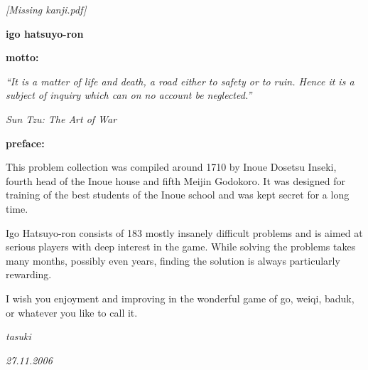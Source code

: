\documentclass[11pt]{book}
\begin{document}
\begin{titlepage}

    \vspace*{0.2\textheight}

    \begin{center}
        \textit{\large [Missing kanji.pdf]}
    \end{center}
    \begin{center}
        \textbf{\huge igo hatsuyo-ron}
    \end{center}

\end{titlepage}

\newpage %


\noindent\textbf{\Large motto:}

\medskip
\textit{\normalsize ``It is a matter of life and death, a road either to safety or to ruin. Hence it is a subject of inquiry which can on no account be neglected.''}

\medskip
\hfill {\it Sun Tzu: The Art of War}
\bigskip

\noindent\textbf{\Large preface:}

\medskip
{
\normalsize
This problem collection was compiled around 1710 by Inoue Dosetsu Inseki, fourth head of the Inoue house and fifth Meijin Godokoro. It was designed for training of the best students of the Inoue school and was kept secret for a long time.

Igo Hatsuyo-ron consists of 183 mostly insanely difficult problems and is aimed at serious players with deep interest in the game. While solving the problems takes many months, possibly even years, finding the solution is always particularly rewarding.

I wish you enjoyment and improving in the wonderful game of go, weiqi, baduk, or whatever you like to call it.
}

\medskip
\hfill \textit{tasuki}

\hfill \textit{27.11.2006}

\newpage %


\begin{multicols}{2}
    
\end{multicols}
\end{document}
